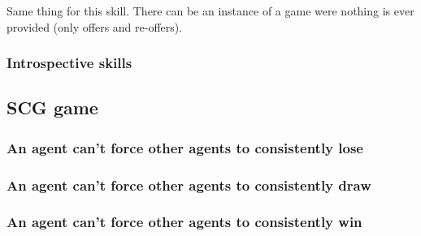 \documentclass[letterpaper,12pt,oneside]{article}
\begin{document}
Same thing for this skill. There can be an instance of a game were nothing
is ever provided (only offers and re-offers).

\subsubsection{Introspective skills}


\subsection{SCG game}

\subsubsection{An agent can't force other agents to consistently lose}
\subsubsection{An agent can't force other agents to consistently draw}
\subsubsection{An agent can't force other agents to consistently win}

% 
% 
\end{document}
